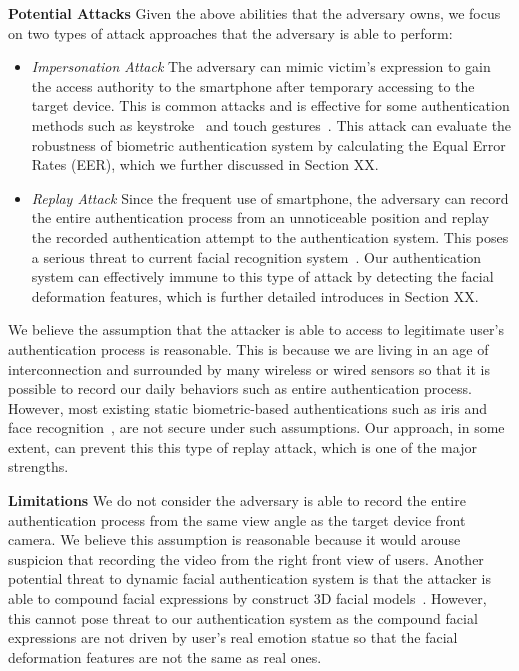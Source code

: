         \noindent \textbf{Potential Attacks} Given the above abilities that the adversary owns, we focus on two types of attack approaches that the adversary is able to perform:
        \begin{itemize}
            \item \emph{Impersonation Attack} The adversary can mimic victim's expression to gain the access authority to the smartphone after temporary accessing to the target device. This is common attacks and is effective for some authentication methods such as keystroke~\cite{Phoha2012Hidden} and touch gestures~\cite{de2012touch}. This attack can evaluate the robustness of biometric authentication system by calculating the Equal Error Rates (EER), which we further discussed in Section XX.
            \item \emph{Replay Attack} Since the frequent use of smartphone, the adversary can record the entire authentication process from an unnoticeable position and replay the recorded authentication attempt to the authentication system. This poses a serious threat to current facial recognition system~\cite{GoldenEye2012Hegde}. Our authentication system can effectively immune to this type of attack by detecting the facial deformation features, which is further detailed introduces in Section XX.
        \end{itemize}
        
        We believe the assumption that the attacker is able to access to legitimate user's authentication process is reasonable. This is because we are living in an age of interconnection and surrounded by many wireless or wired sensors so that it is possible to record our daily behaviors such as entire authentication process. However, most existing static biometric-based authentications such as iris and face recognition~\cite{Boehm2013SAFE}, are not secure under such assumptions. Our approach, in some extent, can prevent this this type of replay attack, which is one of the major strengths.

        \noindent \textbf{Limitations} We do not consider the adversary is able to record the entire authentication process from the same view angle as the target device front camera. We believe this assumption is reasonable because it would arouse suspicion that recording the video from the right front view of users. Another potential threat to dynamic facial authentication system is that the attacker is able to compound facial expressions by construct 3D facial models~\cite{Xu2016VirtualU}. However, this cannot pose threat to our authentication system as the compound facial expressions are not driven by user's real emotion statue so that the facial deformation features are not the same as real ones.


